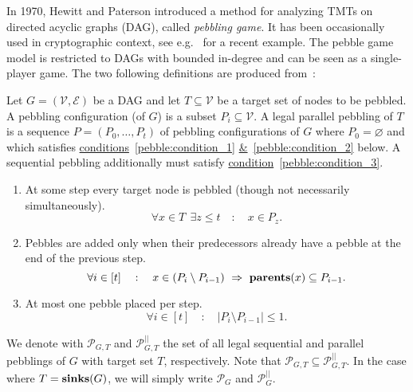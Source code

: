 In 1970, Hewitt and Paterson introduced a method for analyzing TMTs on directed acyclic graphs (DAG), called \emph{pebbling game}. It has been occasionally used in cryptographic context, see e.g.~\cite{Dziembowski:2011:KSR:2033036.2033061} for a recent example. The pebble game model is restricted to DAGs with bounded in-degree and can be seen as a single-player game. The two following definitions are produced from~\cite{cryptoeprint:2016:875}:

\begin{definition}
  Let $G=(\mathcal{V},\mathcal{E})$ be a DAG and let $T \subseteq \mathcal{V}$ be a target set of nodes to be pebbled. A pebbling configuration (of $G$) is a subset $P_i \subseteq \mathcal{V}$. A legal parallel pebbling of $T$ is a sequence $P=(P_0,\dots,P_t)$ of pebbling configurations of $G$ where $P_0 = \varnothing$ and which satisfies \hyperref[pebble:condition_1]{conditions}~\ref{pebble:condition_1}
  \hyperref[pebble:condition_2]{\&}~\ref{pebble:condition_2} below. A sequential pebbling additionally must satisfy \hyperref[pebble:condition_3]{condition}~\ref{pebble:condition_3}.

  \begin{enumerate}
    \item \label{pebble:condition_1} At some step every target node is pebbled (though not necessarily simultaneously).
%
    \begin{equation} \label{eqn:pebcondition_1}
      \forall x \in T \ \ \exists z \leq t \quad : \quad x \in P_z.
    \end{equation}
%
    \item \label{pebble:condition_2} Pebbles are added only when their predecessors already have a pebble at the end of the previous step.
%
    \begin{equation} \label{eqn:pebcondition_2}
      \forall i \in [t] \quad : \quad x \in (P_i \setminus P_{i-1}) \ \Rightarrow \ \mbox{\textbf{parents}}(x) \subseteq P_{i-1}.
    \end{equation}
%
    \item \label{pebble:condition_3} At most one pebble placed per step.
%
    \begin{equation} \label{eqn:pebcondition_3}
      \forall i \in [t] \quad : \quad \lvert P_i \setminus P_{i-1} \rvert \leq 1.
    \end{equation}
%
  \end{enumerate}
%
  We denote with $\mathcal{P}_{G,T}$ and $\mathcal{P}_{G,T}^{||}$ the set of all legal sequential and parallel pebblings of $G$ with target set $T$, respectively.
  Note that $\mathcal{P}_{G,T} \subseteq \mathcal{P}_{G,T}^{||}$. In the case where $T=\mbox{\textbf{sinks}}(G)$, we will simply write $\mathcal{P}_{G}$ and
  $\mathcal{P}_{G}^{||}$.
%
\end{definition}

